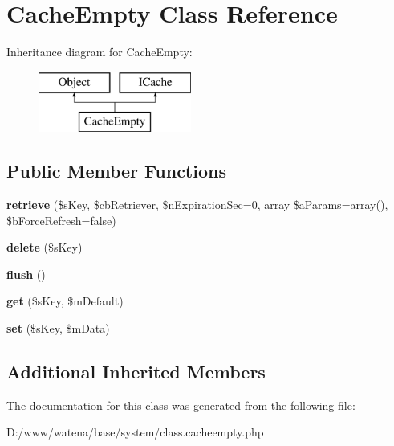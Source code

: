 \hypertarget{class_cache_empty}{\section{Cache\-Empty Class Reference}
\label{class_cache_empty}
}
Inheritance diagram for Cache\-Empty\-:\begin{figure}[H]
\begin{center}
\leavevmode
\includegraphics[height=2.000000cm]{class_cache_empty}
\end{center}
\end{figure}
\subsection*{Public Member Functions}
\begin{DoxyCompactItemize}
\item 
\hypertarget{class_cache_empty_a3a258d251b13eeca27c50b4546050914}{{\bfseries retrieve} (\$s\-Key, \$cb\-Retriever, \$n\-Expiration\-Sec=0, array \$a\-Params=array(), \$b\-Force\-Refresh=false)}\label{class_cache_empty_a3a258d251b13eeca27c50b4546050914}

\item 
\hypertarget{class_cache_empty_a8d2a42394616f64ccd57f2206ba20fdf}{{\bfseries delete} (\$s\-Key)}\label{class_cache_empty_a8d2a42394616f64ccd57f2206ba20fdf}

\item 
\hypertarget{class_cache_empty_a0630b9e99f9bddf88cc47349daa790da}{{\bfseries flush} ()}\label{class_cache_empty_a0630b9e99f9bddf88cc47349daa790da}

\item 
\hypertarget{class_cache_empty_aa63f47064a276997be2d4351dbf17775}{{\bfseries get} (\$s\-Key, \$m\-Default)}\label{class_cache_empty_aa63f47064a276997be2d4351dbf17775}

\item 
\hypertarget{class_cache_empty_a639de1178df60dc39eb57769ca11386b}{{\bfseries set} (\$s\-Key, \$m\-Data)}\label{class_cache_empty_a639de1178df60dc39eb57769ca11386b}

\end{DoxyCompactItemize}
\subsection*{Additional Inherited Members}


The documentation for this class was generated from the following file\-:\begin{DoxyCompactItemize}
\item 
D\-:/www/watena/base/system/class.\-cacheempty.\-php\end{DoxyCompactItemize}
